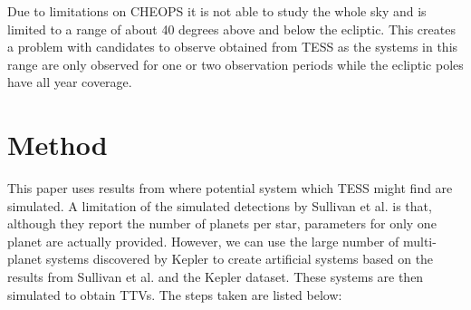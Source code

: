 \documentclass[12pt]{report}
\begin{document}
	Due to limitations on CHEOPS it is not able to study the whole sky and is limited to a range of about 40 degrees above and below the ecliptic. This creates a problem with candidates to observe obtained from TESS as the systems in this range are only observed for one or two observation periods while the ecliptic poles have all year coverage.
	
\chapter{Method}
	This paper uses results from \cite{2015ApJ...809...77S} where potential system which TESS might find are simulated. A limitation of the simulated detections by Sullivan et al. is that, although they report the number of planets per star, parameters for only one planet are actually provided. However, we can use the large number of multi-planet systems discovered by Kepler to create artificial systems based on the results from Sullivan et al. and the Kepler dataset. These systems are then simulated to obtain TTVs. The steps taken are listed below:
	
\end{document}

